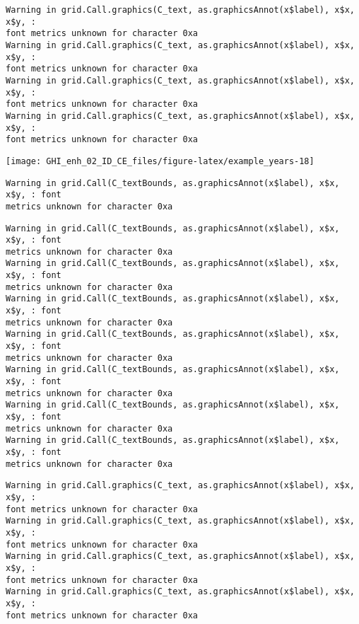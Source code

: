 \documentclass[
  10pt,
  a4paper,oneside]{article}
\begin{document}
\begin{verbatim}
Warning in grid.Call.graphics(C_text, as.graphicsAnnot(x$label), x$x, x$y, :
font metrics unknown for character 0xa
Warning in grid.Call.graphics(C_text, as.graphicsAnnot(x$label), x$x, x$y, :
font metrics unknown for character 0xa
Warning in grid.Call.graphics(C_text, as.graphicsAnnot(x$label), x$x, x$y, :
font metrics unknown for character 0xa
Warning in grid.Call.graphics(C_text, as.graphicsAnnot(x$label), x$x, x$y, :
font metrics unknown for character 0xa
\end{verbatim}

\begin{center}\texttt{[image: GHI\_enh\_02\_ID\_CE\_files/figure-latex/example\_years-18]} \end{center}

\begin{verbatim}
Warning in grid.Call(C_textBounds, as.graphicsAnnot(x$label), x$x, x$y, : font
metrics unknown for character 0xa
\end{verbatim}

\begin{verbatim}
Warning in grid.Call(C_textBounds, as.graphicsAnnot(x$label), x$x, x$y, : font
metrics unknown for character 0xa
Warning in grid.Call(C_textBounds, as.graphicsAnnot(x$label), x$x, x$y, : font
metrics unknown for character 0xa
Warning in grid.Call(C_textBounds, as.graphicsAnnot(x$label), x$x, x$y, : font
metrics unknown for character 0xa
Warning in grid.Call(C_textBounds, as.graphicsAnnot(x$label), x$x, x$y, : font
metrics unknown for character 0xa
Warning in grid.Call(C_textBounds, as.graphicsAnnot(x$label), x$x, x$y, : font
metrics unknown for character 0xa
Warning in grid.Call(C_textBounds, as.graphicsAnnot(x$label), x$x, x$y, : font
metrics unknown for character 0xa
Warning in grid.Call(C_textBounds, as.graphicsAnnot(x$label), x$x, x$y, : font
metrics unknown for character 0xa
\end{verbatim}

\begin{verbatim}
Warning in grid.Call.graphics(C_text, as.graphicsAnnot(x$label), x$x, x$y, :
font metrics unknown for character 0xa
Warning in grid.Call.graphics(C_text, as.graphicsAnnot(x$label), x$x, x$y, :
font metrics unknown for character 0xa
Warning in grid.Call.graphics(C_text, as.graphicsAnnot(x$label), x$x, x$y, :
font metrics unknown for character 0xa
Warning in grid.Call.graphics(C_text, as.graphicsAnnot(x$label), x$x, x$y, :
font metrics unknown for character 0xa
\end{verbatim}
\end{document}
